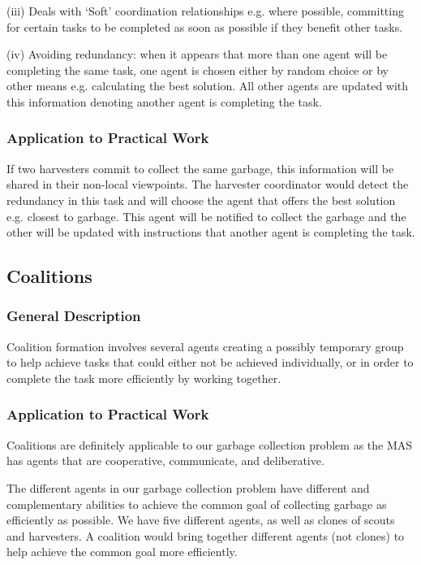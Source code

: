 (iii) Deals with ‘Soft’ coordination relationships e.g. where possible, committing for certain tasks to be completed as soon as possible if they benefit other tasks. 

(iv) Avoiding redundancy:  when it appears that more than one agent will be completing the same task, one agent is chosen either by random choice or by other means e.g. calculating the best solution. All other agents are updated with this information denoting another agent is completing the task. 

\subsubsection{Application to Practical Work}

If two harvesters commit to collect the same garbage, this information will be shared in their non-local viewpoints. The harvester coordinator would detect the redundancy in this task and will choose the agent that offers the best solution e.g. closest to garbage.  This agent will be notified to collect the garbage and the other will be updated with instructions that another agent is completing the task. 



\subsection{Coalitions}

\subsubsection{General Description}

Coalition formation involves several agents creating a possibly temporary group to help achieve tasks that could either not be achieved individually, or in order to complete the task more efficiently by working together.

\subsubsection{Application to Practical Work}

Coalitions are definitely applicable to our garbage collection problem as the MAS has agents that are cooperative, communicate, and deliberative.
 
The different agents in our garbage collection problem have different and complementary abilities to achieve the common goal of collecting garbage as efficiently as possible. We have five different agents, as well as clones of scouts and harvesters. A coalition would bring together different agents (not clones) to help achieve the common goal more efficiently.
 
